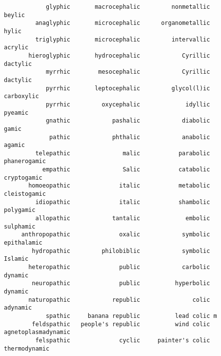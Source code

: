 \begin{verbatim}
            glyphic       macrocephalic         nonmetallic              beylic 
         anaglyphic       microcephalic      organometallic               hylic 
         triglyphic       microcephalic         intervallic             acrylic 
       hieroglyphic       hydrocephalic            Cyrillic            dactylic 
            myrrhic        mesocephalic            Cyrillic            dactylic 
            pyrrhic       leptocephalic         glycol(l)ic          carboxylic 
            pyrrhic         oxycephalic             idyllic             pyeamic 
            gnathic            pashalic            diabolic               gamic 
             pathic            phthalic            anabolic              agamic 
         telepathic               malic           parabolic        phanerogamic 
           empathic               Salic           catabolic         cryptogamic 
       homoeopathic              italic           metabolic        cleistogamic 
         idiopathic              italic           shambolic           polygamic 
         allopathic            tantalic             embolic           sulphamic 
     anthropopathic              oxalic            symbolic         epithalamic 
        hydropathic         philobiblic            symbolic             Islamic 
       heteropathic              public            carbolic             dynamic 
        neuropathic              public          hyperbolic             dynamic 
       naturopathic            republic               colic            adynamic 
            spathic     banana republic          lead colic m                   
        feldspathic   people's republic          wind colic agnetoplasmadynamic 
         felspathic              cyclic     painter's colic       thermodynamic 
\end{verbatim}

